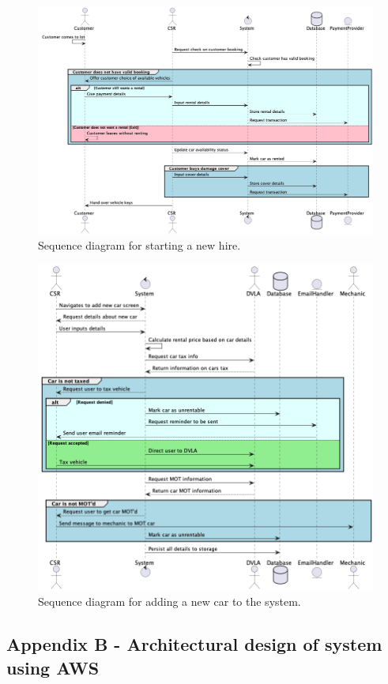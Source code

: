   \begin{figure}[H]
    \centering
    \includegraphics[width=12cm]{assets/Sequence4.png}
    \caption{Sequence diagram for starting a new hire.}
    \label{fig:startHireSequence}
  \end{figure}

  \begin{figure}[H]
    \centering
    \includegraphics[width=12cm]{assets/Sequence5.png}
    \caption{Sequence diagram for adding a new car to the system.}
    \label{fig:newCarSequence}
  \end{figure}

\newpage
\subsection{Appendix B - Architectural design of system using AWS}
\label{sec:AppendixB}

